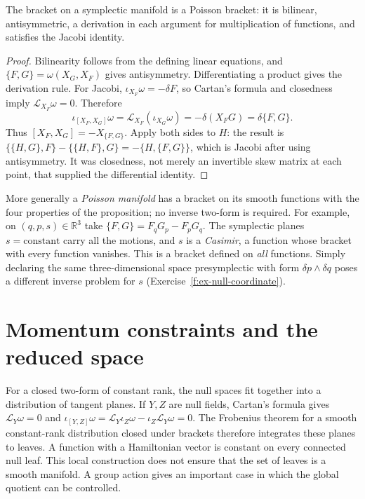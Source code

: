 \begin{proposition}\label{f:poisson-jacobi}
The bracket on a symplectic manifold is a Poisson bracket: it is bilinear, antisymmetric, a derivation in each argument for multiplication of functions, and satisfies the Jacobi identity.
\end{proposition}
\begin{proof}
Bilinearity follows from the defining linear equations, and $\{F,G\}=\omega(X_G,X_F)$ gives antisymmetry. Differentiating a product gives the derivation rule. For Jacobi, $\iota_{X_F}\omega=-\delta F$, so Cartan's formula and closedness imply $\mathcal L_{X_F}\omega=0$. Therefore
\[
 \iota_{[X_F,X_G]}\omega=\mathcal L_{X_F}(\iota_{X_G}\omega)
      =-\delta(X_F G)=\delta\{F,G\}.
\]
Thus $[X_F,X_G]=-X_{\{F,G\}}$. Apply both sides to $H$: the result is $\{\{H,G\},F\}-\{\{H,F\},G\}=-\{H,\{F,G\}\}$, which is Jacobi after using antisymmetry. It was closedness, not merely an invertible skew matrix at each point, that supplied the differential identity.
\end{proof}

More generally a \emph{Poisson manifold} has a bracket on its smooth functions with the four properties of the proposition; no inverse two-form is required. For example, on $(q,p,s)\in\mathbb R^3$ take $\{F,G\}=F_qG_p-F_pG_q$. The symplectic planes $s=\text{constant}$ carry all the motions, and $s$ is a \emph{Casimir}, a function whose bracket with every function vanishes. This is a bracket defined on \emph{all} functions. Simply declaring the same three-dimensional space presymplectic with form $\delta p\wedge\delta q$ poses a different inverse problem for $s$ (Exercise~\ref{f:ex-null-coordinate}).

\section{Momentum constraints and the reduced space}
For a closed two-form of constant rank, the null spaces fit together into a distribution of tangent planes. If $Y,Z$ are null fields, Cartan's formula gives $\mathcal L_Y\omega=0$ and $\iota_{[Y,Z]}\omega=\mathcal L_Y\iota_Z\omega-\iota_Z\mathcal L_Y\omega=0$. The Frobenius theorem for a smooth constant-rank distribution closed under brackets \cite{LeeSM} therefore integrates these planes to leaves. A function with a Hamiltonian vector is constant on every connected null leaf. This local construction does not ensure that the set of leaves is a smooth manifold. A group action gives an important case in which the global quotient can be controlled.

